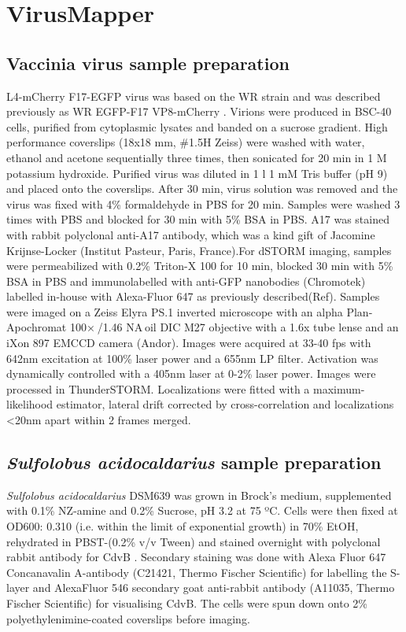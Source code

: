 \section{VirusMapper}

\subsection{Vaccinia virus sample preparation}
 
L4-mCherry F17-EGFP virus was based on the WR strain and was described previously as WR EGFP-F17 VP8-mCherry \cite{schmidt2013vaccinia}. Virions were produced in BSC-40 cells, purified from cytoplasmic lysates and banded on a sucrose gradient. High performance coverslips (18x18 mm, \#1.5H Zeiss) were washed with water, ethanol and acetone sequentially three times, then sonicated for 20 min in 1 M potassium hydroxide. Purified virus was diluted in 1 \textmu{}l 1 mM Tris buffer (pH 9) and placed onto the coverslips. After 30 min, virus solution was removed and the virus was fixed with 4\% formaldehyde in PBS for 20 min. Samples were washed 3 times with PBS and blocked for 30 min with 5\% BSA in PBS. A17 was stained with rabbit polyclonal anti-A17 antibody, which was a kind gift of Jacomine Krijnse-Locker (Institut Pasteur, Paris, France).For dSTORM imaging, samples were permeabilized with 0.2\% Triton-X 100 for 10 min, blocked 30 min with 5\% BSA in PBS and immunolabelled with anti-GFP nanobodies (Chromotek) labelled in-house with Alexa-Fluor 647 as previously described(Ref). Samples were imaged on a Zeiss Elyra PS.1 inverted microscope with an alpha Plan-Apochromat 100× /1.46 NA oil DIC M27 objective with a 1.6x tube lense and an iXon 897 EMCCD camera (Andor). Images were acquired at 33-40 fps with 642nm excitation at 100\% laser power and a 655nm LP filter. Activation was dynamically controlled with a 405nm laser at 0-2\% laser power. Images were processed in ThunderSTORM\cite{ovesny2014thunderstorm}. Localizations were fitted with a maximum-likelihood estimator, lateral drift corrected by cross-correlation and localizations <20nm apart within 2 frames merged.

\subsection{\textit{Sulfolobus acidocaldarius} sample preparation}

\textit{Sulfolobus acidocaldarius} DSM639 was grown in Brock’s medium, supplemented with 0.1\% NZ-amine and 0.2\% Sucrose, pH 3.2 at 75 ºC. Cells were then fixed at OD600: 0.310 (i.e. within the limit of exponential growth) in 70\% EtOH, rehydrated in PBST-(0.2\% v/v Tween) and stained overnight with polyclonal rabbit antibody for CdvB \cite{Lindås et al, 2008}. Secondary staining was done with Alexa Fluor 647 Concanavalin A-antibody (C21421, Thermo Fischer Scientific) for labelling the S-layer and AlexaFluor 546 secondary goat anti-rabbit antibody (A11035, Thermo Fischer Scientific) for visualising CdvB. The cells were spun down onto 2\% polyethylenimine-coated coverslips before imaging.
 
